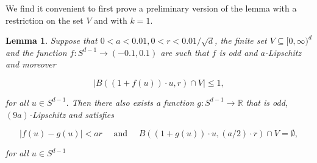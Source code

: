 \documentclass[11pt]{article}%
\newtheorem{lemma}[lemma]{Lemma}
\newcommand{\eR}[0]{\ensuremath{ \mathbb R}}
\begin{document}
We find it convenient to first prove a preliminary version of the lemma with a restriction on the set $V$
and with $k=1$.


\begin{lemma}\label{lem:fgorth}
Suppose that $0 < a < 0.01, 0 < r < 0.01/\sqrt{d}$, the finite set $V \subseteq [0,\infty)^d$
and the function $f :S^{d-1} \to (-0.1,0.1)$ are such that  
$f$ is odd and $a$-Lipschitz and moreover

$$ \left|B\left( (1+f(u))\cdot u, r \right) \cap V\right| \leq 1, $$

\noindent
for all $u \in S^{d-1}$.
Then there also exists a function $g : S^{d-1} \to \eR$ that is odd, $(9a)$-Lipschitz and satisfies 

$$ \left|f(u)-g(u)\right| < ar \quad \text{ and } \quad 
B\left( (1+g(u)) \cdot u, (a/2) \cdot r  \right) \cap V = \emptyset, $$

\noindent 
for all $u \in S^{d-1}$
\end{lemma}
% 
\end{document}
